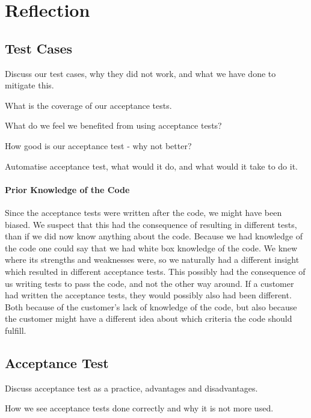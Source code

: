 \section{Reflection}
\subsection{Test Cases}
Discuss our test cases, why they did not work, and what we have done to mitigate this.

What is the coverage of our acceptance tests.

What do we feel we benefited from using acceptance tests?

How good is our acceptance test - why not better?

Automatise acceptance test, what would it do, and what would it take to do it.

\paragraph{Prior Knowledge of the Code}
Since the acceptance tests were written after the code, we might have been biased. We suspect that this had the consequence of resulting in different tests, than if we did now know anything about the code. Because we had knowledge of the code one could say that we had white box knowledge of the code. We knew where its strengths and weaknesses were, so we naturally had a different insight which resulted in different acceptance tests.
This possibly had the consequence of us writing tests to pass the code, and not the other way around. If a customer had written the acceptance tests, they would possibly also had been different. Both because of the customer's lack of knowledge of the code, but also because the customer might have a different idea about which criteria the code should fulfill.


\subsection{Acceptance Test}
Discuss acceptance test as a practice, advantages and disadvantages.

How we see acceptance tests done correctly and why it is not more used.
